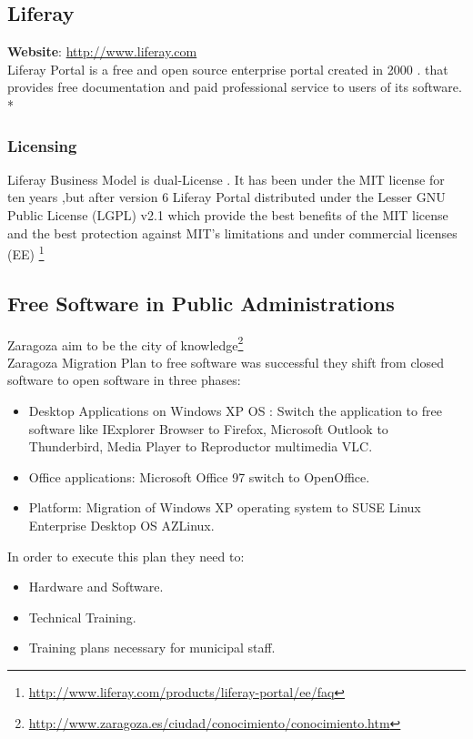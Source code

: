\documentclass[11pt]{article} %
\begin{document}
\subsection{Liferay} %

\textbf{Website}: \url {http://www.liferay.com}\\

Liferay Portal is a free and open source enterprise portal  created in 2000 . that provides free documentation and paid professional service to users of its software. \\*

\subsubsection{Licensing}

Liferay Business Model is  dual-License . It has been under the MIT license for ten years ,but after version 6 Liferay Portal distributed under the Lesser GNU Public License (LGPL) v2.1 which provide the best benefits of the MIT license and the best protection against MIT’s limitations and under commercial licenses  (EE) \footnote {\url{http://www.liferay.com/products/liferay-portal/ee/faq}}

\subsection{Free Software in Public Administrations} %

Zaragoza  aim to be  the city of knowledge\footnote {\url{http://www.zaragoza.es/ciudad/conocimiento/conocimiento.htm}}\\
Zaragoza Migration Plan to free software was successful they shift from closed software to open software in three phases:

\begin{itemize}
\item Desktop Applications on Windows XP OS : Switch the application to free software like IExplorer Browser to Firefox, Microsoft Outlook to Thunderbird, Media Player to Reproductor multimedia VLC.
\item Office applications: Microsoft Office 97 switch to OpenOffice.
\item Platform: Migration of Windows XP operating system to SUSE Linux Enterprise Desktop OS AZLinux.
\end{itemize}
In order to execute this plan they need to:
\begin{itemize}
\item Hardware and Software.
\item Technical Training.
\item Training plans necessary for municipal staff.
\end{itemize}
\end{document}
